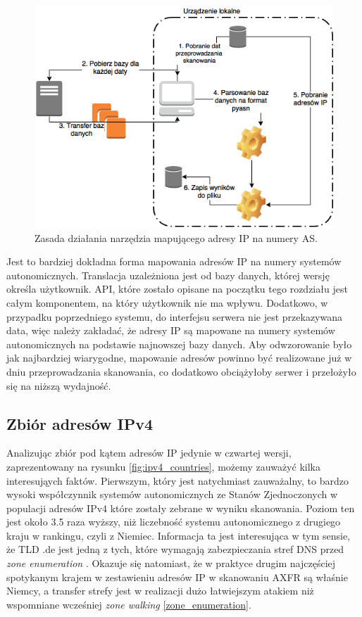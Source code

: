 \begin{figure}[h]
	\centering
	\includegraphics[width=1.0\textwidth]{image/netcat}
	\caption{Zasada działania narzędzia mapującego adresy IP na numery AS.}
	\label{fig:netcat}
\end{figure}

Jest to bardziej dokładna forma mapowania adresów IP na numery
systemów autonomicznych. Translacja uzależniona jest od bazy danych, której wersję określa użytkownik. API, które zostało opisane
na początku tego rozdziału jest całym komponentem, na który użytkownik nie ma wpływu. Dodatkowo, w przypadku poprzedniego systemu,
do interfejsu serwera nie jest przekazywana data, więc należy zakładać, że adresy IP są mapowane na numery systemów autonomicznych
na podstawie najnowszej bazy danych. Aby odwzorowanie było jak najbardziej wiarygodne, mapowanie adresów powinno być realizowane
już w dniu przeprowadzania skanowania, co dodatkowo obciążyłoby serwer i przełożyło się na niższą wydajność.

\subsection{Zbiór adresów IPv4}
\label{sec:ipv4_results}
Analizując zbiór pod kątem adresów IP jedynie w czwartej wersji, zaprezentowany na rysunku \ref{fig:ipv4_countries}, możemy
zauważyć kilka interesująych faktów. Pierwszym, który jest natychmiast zauważalny, to bardzo wysoki współczynnik systemów autonomicznych
ze Stanów Zjednoczonych w populacji adresów IPv4 które zostały zebrane w wyniku skanowania. Poziom ten jest około 3.5 raza wyższy,
niż liczebność systemu autonomicznego z drugiego kraju w rankingu, czyli z Niemiec. Informacja ta jest interesująca w tym sensie, że
TLD .de jest jedną z tych, które wymagają zabezpieczania stref DNS przed \textit{zone enumeration} \cite{euLaw, zoneEnumeration}.
Okazuje się natomiast,
że w praktyce drugim najczęściej spotykanym krajem w zestawieniu adresów IP w skanowaniu AXFR są właśnie Niemcy, a transfer strefy
jest w realizacji dużo łatwiejszym atakiem niż wspomniane wcześniej \textit{zone walking} \ref{zone_enumeration}.

